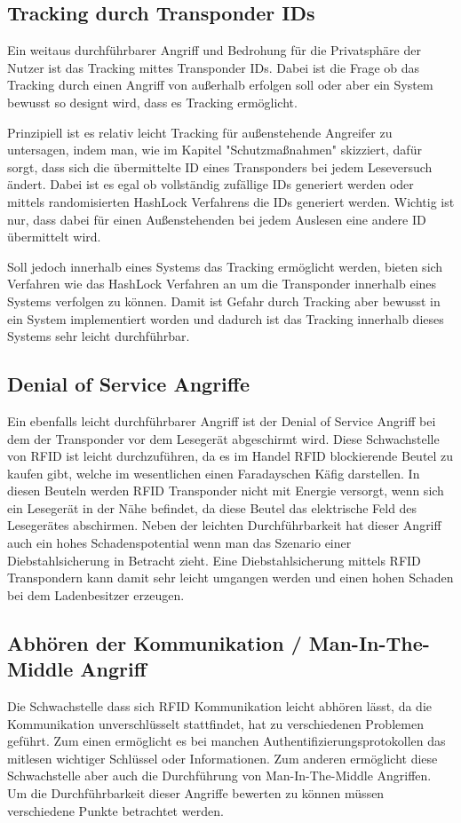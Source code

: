 \documentclass[conference]{IEEEtran}
\begin{document}
\subsection{Tracking durch Transponder IDs}
Ein weitaus durchführbarer Angriff und Bedrohung für die Privatsphäre der Nutzer ist das Tracking mittes Transponder IDs. Dabei ist die Frage ob das Tracking durch einen Angriff von außerhalb erfolgen soll oder aber ein System bewusst so designt wird, dass es Tracking ermöglicht.

Prinzipiell ist es relativ leicht Tracking für außenstehende Angreifer zu untersagen, indem man, wie im Kapitel "Schutzmaßnahmen" skizziert, dafür sorgt, dass sich die übermittelte ID eines Transponders bei jedem Leseversuch ändert. Dabei ist es egal ob vollständig zufällige IDs generiert werden oder mittels randomisierten HashLock Verfahrens die IDs generiert werden. Wichtig ist nur, dass dabei für einen Außenstehenden bei jedem Auslesen eine andere ID übermittelt wird.

Soll jedoch innerhalb eines Systems das Tracking ermöglicht werden, bieten sich Verfahren wie das HashLock Verfahren an um die Transponder innerhalb eines Systems verfolgen zu können. Damit ist Gefahr durch Tracking aber bewusst in ein  System implementiert worden und dadurch ist das Tracking innerhalb dieses Systems sehr leicht durchführbar.


\subsection{Denial of Service Angriffe}
Ein ebenfalls leicht durchführbarer Angriff ist der Denial of Service Angriff bei dem der Transponder vor dem Lesegerät abgeschirmt wird. Diese Schwachstelle von RFID ist leicht durchzuführen, da es im Handel RFID blockierende Beutel zu kaufen gibt, welche im wesentlichen einen Faradayschen Käfig darstellen. In diesen Beuteln werden RFID Transponder nicht mit Energie versorgt, wenn sich ein Lesegerät in der Nähe befindet, da diese Beutel das elektrische Feld des Lesegerätes abschirmen. Neben der leichten Durchführbarkeit hat dieser Angriff auch ein hohes Schadenspotential wenn man das Szenario einer Diebstahlsicherung in Betracht zieht. Eine Diebstahlsicherung mittels RFID Transpondern kann damit sehr leicht umgangen werden und einen hohen Schaden bei dem Ladenbesitzer erzeugen.

\subsection{Abhören der Kommunikation / Man-In-The-Middle Angriff}
Die Schwachstelle dass sich RFID Kommunikation leicht abhören lässt, da die Kommunikation unverschlüsselt stattfindet, hat zu verschiedenen Problemen geführt. Zum einen ermöglicht es bei manchen Authentifizierungsprotokollen das mitlesen wichtiger Schlüssel oder Informationen. Zum anderen ermöglicht diese Schwachstelle aber auch die Durchführung von Man-In-The-Middle Angriffen. Um die Durchführbarkeit dieser Angriffe bewerten zu können müssen verschiedene Punkte betrachtet werden.
\end{document}
